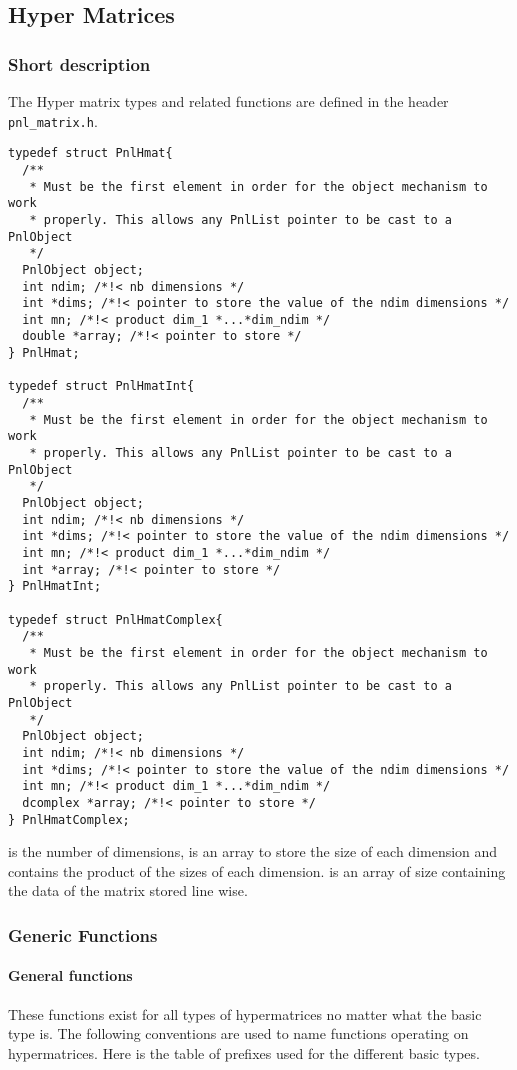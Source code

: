 \subsection{Hyper Matrices}
\subsubsection{Short description}

The Hyper matrix types and related functions are defined in the header \verb!pnl_matrix.h!.

\begin{verbatim}
typedef struct PnlHmat{
  /**
   * Must be the first element in order for the object mechanism to work
   * properly. This allows any PnlList pointer to be cast to a PnlObject
   */
  PnlObject object; 
  int ndim; /*!< nb dimensions */ 
  int *dims; /*!< pointer to store the value of the ndim dimensions */ 
  int mn; /*!< product dim_1 *...*dim_ndim */
  double *array; /*!< pointer to store */
} PnlHmat;

typedef struct PnlHmatInt{
  /**
   * Must be the first element in order for the object mechanism to work
   * properly. This allows any PnlList pointer to be cast to a PnlObject
   */
  PnlObject object; 
  int ndim; /*!< nb dimensions */ 
  int *dims; /*!< pointer to store the value of the ndim dimensions */ 
  int mn; /*!< product dim_1 *...*dim_ndim */
  int *array; /*!< pointer to store */
} PnlHmatInt;

typedef struct PnlHmatComplex{
  /**
   * Must be the first element in order for the object mechanism to work
   * properly. This allows any PnlList pointer to be cast to a PnlObject
   */
  PnlObject object; 
  int ndim; /*!< nb dimensions */ 
  int *dims; /*!< pointer to store the value of the ndim dimensions */ 
  int mn; /*!< product dim_1 *...*dim_ndim */
  dcomplex *array; /*!< pointer to store */
} PnlHmatComplex;
\end{verbatim}
 is the number of dimensions,  is an array to store the
size of each dimension and  contains the product of the sizes of each
dimension.  is an array of size  containing the data of the
matrix stored line wise.


\subsubsection{Generic Functions}
\paragraph{General functions}
These functions exist for all types of hypermatrices no matter what the basic type
is. The following conventions are used to name functions operating on hypermatrices.
Here is the table of prefixes used for the different basic types.

